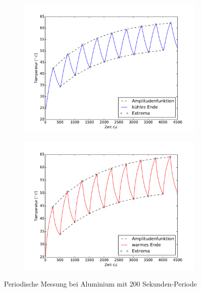 \begin{figure}[htp]
	\label{fig:M3Alu}
	\centering
	\begin{subfigure}{0.9\textwidth}
	\centering
	\includegraphics[width=\textwidth]{Bilder/M3_Alu_kuehl.pdf}
	\end{subfigure}
	\begin{subfigure}{0.9\textwidth}
	\centering
	\includegraphics[width=\textwidth]{Bilder/M3_Alu_warm.pdf}
	\end{subfigure}
	\caption{Periodische Messung bei Aluminium mit 200 Sekunden-Periode}
\end{figure}
